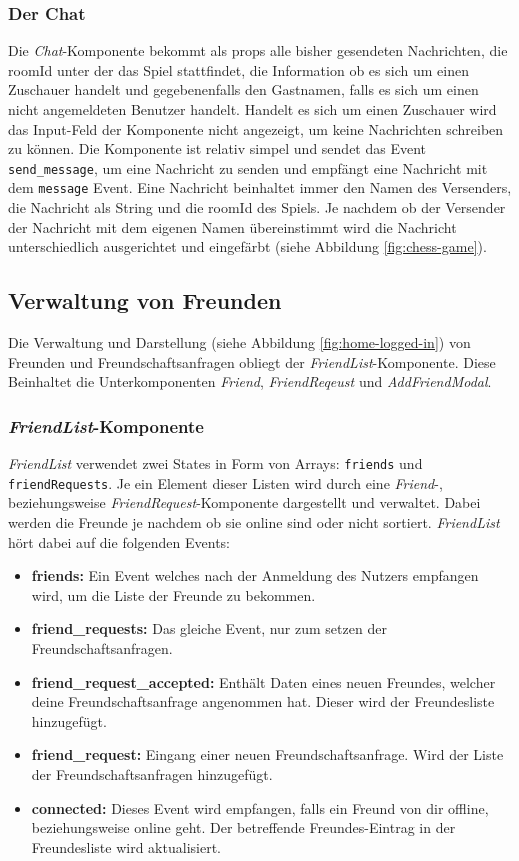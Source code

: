 \subsubsection{Der Chat}
Die \textit{Chat}-Komponente bekommt als props alle bisher gesendeten Nachrichten, die roomId unter der das Spiel stattfindet, die Information ob es sich um einen Zuschauer handelt und gegebenenfalls den Gastnamen, falls es sich um einen nicht angemeldeten Benutzer handelt. Handelt es sich um einen Zuschauer wird das Input-Feld der Komponente nicht angezeigt, um keine Nachrichten schreiben zu können. Die Komponente ist relativ simpel und sendet das Event \verb|send_message|, um eine Nachricht zu senden und empfängt eine Nachricht mit dem \verb|message| Event. Eine Nachricht beinhaltet immer den Namen des Versenders, die Nachricht als String und die roomId des Spiels. Je nachdem ob der Versender der Nachricht mit dem eigenen Namen übereinstimmt wird die Nachricht unterschiedlich ausgerichtet und eingefärbt (siehe Abbildung \ref{fig:chess-game}).

\subsection{Verwaltung von Freunden}
\label{sec:Friends}
Die Verwaltung und Darstellung (siehe Abbildung \ref{fig:home-logged-in}) von Freunden und Freundschaftsanfragen obliegt der \textit{FriendList}-Komponente. Diese Beinhaltet die Unterkomponenten \textit{Friend}, \textit{FriendReqeust} und \textit{AddFriendModal}.

\subsubsection{\textit{FriendList}-Komponente}

\textit{FriendList} verwendet zwei States in Form von Arrays: \verb|friends| und \verb|friendRequests|. Je ein Element dieser Listen wird durch eine \textit{Friend}-, beziehungsweise \textit{FriendRequest}-Komponente dargestellt und verwaltet. Dabei werden die Freunde je nachdem ob sie online sind oder nicht sortiert. \textit{FriendList} hört dabei auf die folgenden Events: 
\begin{itemize}
\item \textbf{friends:} Ein Event welches nach der Anmeldung des Nutzers empfangen wird, um die Liste der Freunde zu bekommen.
\item \textbf{friend\_requests:} Das gleiche Event, nur zum setzen der Freundschaftsanfragen.
\item \textbf{friend\_request\_accepted:} Enthält Daten eines neuen Freundes, welcher deine Freundschaftsanfrage angenommen hat. Dieser wird der Freundesliste hinzugefügt.
\item \textbf{friend\_request:} Eingang einer neuen Freundschaftsanfrage. Wird der Liste der Freundschaftsanfragen hinzugefügt.
\item \textbf{connected:} Dieses Event wird empfangen, falls ein Freund von dir offline, beziehungsweise online geht. Der betreffende Freundes-Eintrag in der Freundesliste wird aktualisiert.
\end{itemize}


